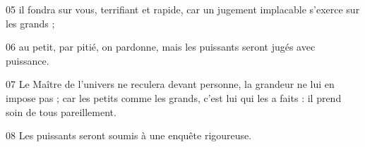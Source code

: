 05 il fondra sur vous, terrifiant et rapide, car un jugement implacable s’exerce sur les grands ;

06 au petit, par pitié, on pardonne, mais les puissants seront jugés avec puissance.

07 Le Maître de l’univers ne reculera devant personne, la grandeur ne lui en impose pas ; car les petits comme les grands, c’est lui qui les a faits : il prend soin de tous pareillement.

08 Les puissants seront soumis à une enquête rigoureuse.

